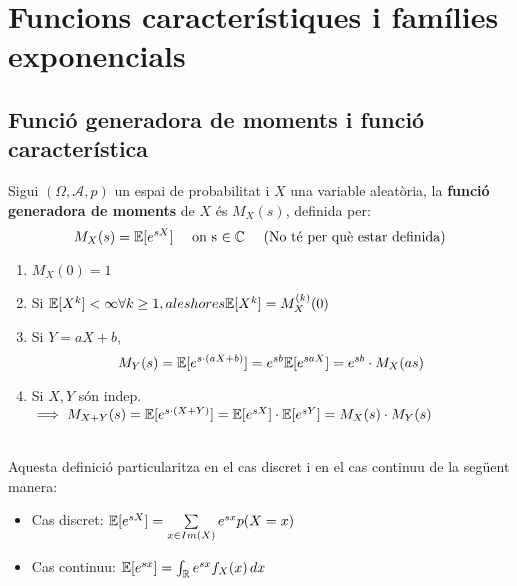 \section{Funcions característiques i famílies exponencials}

\subsection{Funció generadora de moments i funció característica}

\begin{defi}
  Sigui $(\Omega, \mathcal{A}, p)$ un espai de probabilitat i $X$ una variable aleatòria, la \textbf{funció generadora de moments} de $X$ és $M_{X}(s)$, definida per:
  \[
    M_{X}(s) = \mathbb{E}[e^{sX}] \quad \text{ on s $\in \mathbb{C} \quad$ (No té per què estar definida)}
  \]
\end{defi}

\begin{properties}
  \begin{enumerate}
      \item $M_{X}(0) = 1$
      \item Si $\mathbb{E}[X^{k}] < \infty \forall k \geq 1, aleshores \mathbb{E}[X^{k}]=M_{X}^{(k)}(0)$
      \item Si $Y=aX+b$,
      \[
        M_{Y}(s) = \mathbb{E}[e^{s\cdot(aX+b)}] = e^{sb}\mathbb{E}[e^{saX}] = e^{sb}\cdot M_{X}(as)
      \]
      \item Si $X,Y$ són indep. $\implies M_{X+Y}(s) = \mathbb{E}[e^{s\cdot(X+Y)}] = \mathbb{E}[e^{sX}]\cdot\mathbb{E}[e^{sY}] = M_{X}(s)\cdot M_{Y}(s)$
  \end{enumerate}
\end{properties}
\-\\
Aquesta definició particularitza en el cas discret i en el cas continuu de la següent manera:
\begin{itemize}
    \item Cas discret: $\mathbb{E}[e^{sX}] = \sum\limits_{x\in Im(X)}e^{sx}p(X=x)$
    \item Cas continuu: $\mathbb{E}[e^{sx}] = \int_{\mathbb{R}}e^{sx}f_{X}(x) \, dx$
\end{itemize}

